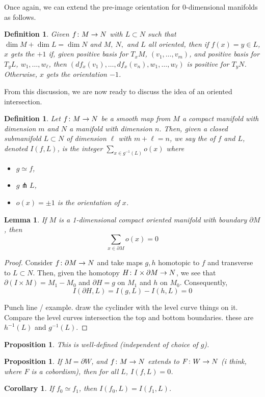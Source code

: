 \documentclass[11pt]{amsbook}
\newenvironment{dateenv}{
	\vspace{1em}
}{
	\vspace{1em}
}
\newcommand{\mydate}[4]{
	\newdate{#1}{#2}{#3}{#4}
	\begin{dateenv}
		\hfill\displaydate{#1}
	\end{dateenv}
}
\theoremstyle{mystyle} %
\newtheorem{defi}[thm]{Definition}
\newtheorem{coro}[thm]{Corollary}
\newtheorem{propo}[thm]{Proposition}
\newtheorem{lemm}[thm]{Lemma}
\numberwithin{thm}{section}
\newcommand{\homotopic}{\simeq}
\renewcommand{\d}{\partial}
\newcommand{\transverse}{\pitchfork}
\begin{document}
Once again, we can extend the pre-image orientation for 0-dimensional
manifolds as follows.
\begin{defi}
  Given \(f \colon M \to N\) with \(L \subset N\) such that \(\dim M +
  \dim L = \dim N\) and \(M,\ N,\) and \(L\) all oriented, then if \(f(x)
  = y \in L\), \(x\) gets the  \(+1\) if, given positive
  basis for \(T_x M\), \((v_1, \ldots, v_m)\),  and positive basis for
  \(T_y L\), \(w_1, \ldots, w_\ell\), then \((df_x(v_1), \ldots,
  df_x(v_n), w_1, \ldots, w_\ell)\) is positive for \(T_y
  N\). Otherwise, \(x\) gets the orientation \(-1\).
\end{defi}
From this discussion, we are now ready to discuss the idea of an
oriented intersection.
\begin{defi}
	Let \(f \colon M \to N\) be a smooth map from \(M\) a compact
        manifold with dimension \(m\) and \(N\) a manifold with
        dimension \(n\). Then, given a closed submanifold \(L \subset
        N\) of dimension \(\ell\) with \(m+\ell = n\), we say
	the  of $f$ and $L$, denoted $I(f,
        L)$, is the integer $\sum_{x \in g^{-1}(L)} o(x)$ where
	\begin{itemize}
		\item $g \homotopic f$,
		\item $g \transverse L$,
		\item $o(x) = \pm 1$ is the orientation of $x$.
	\end{itemize}
\end{defi}
\begin{lemm}
	If $M$ is a 1-dimensional compact oriented manifold with boundary $\d M$, then $$\sum_{x \in \d M} o(x) = 0$$
\end{lemm}
\begin{proof}
  Consider \(f \from \d M \to N\) and take maps \(g,h\) homotopic to
  \(f\) and transverse to \(L \subset N\). Then, given the homotopy
  \(H \from I \times \d M \to N\), we see that \(\d(I \times M) = M_1
  - M_0\) and \(\d H = g\) on \(M_1\) and \(h\) on
  \(M_0\). Consequently, \[
    I(\d H, L) = I(g, L) - I(h, L) = 0
  \]

  Punch line / example.  draw the cyclinder with the level curve things on it.  Compare the level curves intersection the top and bottom boundaries.  these are $h^{-1}(L)$ and $g^{-1}(L)$.
\end{proof}

\mydate{d17}{21}{11}{2016}

\begin{propo}
	This is well-defined (independent of choice of $g$).
\end{propo}
\begin{propo}
	If $M = \d W$, and $f\colon M \to N$ extends to $F\colon W \to N$ (i think, where $F$ is a cobordism), then for all $L$, $I(f,L) = 0$.
\end{propo}
\begin{coro}
	If $f_0 \homotopic f_1$, then $I(f_0, L) = I(f_1, L)$.
\end{coro}
\end{document}
